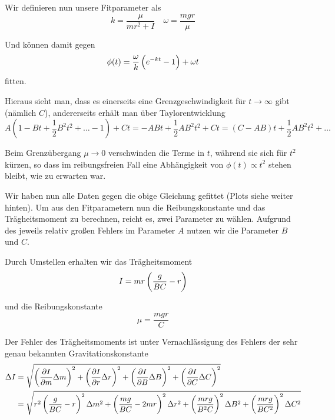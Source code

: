 \documentclass[a4paper,german,12pt,smallheadings]{scrartcl}
\begin{document}
Wir definieren nun unsere Fitparameter als
\begin{equation}
  k = \frac{\mu}{mr^2 + I} \quad
  \omega = \frac{mgr}{\mu}
\end{equation}

Und können damit gegen
\begin{equation}
  \phi(t) = \frac{\omega}{k} \del{e^{-kt} - 1} + \omega t
\end{equation}
fitten.

Hieraus sieht man, dass es einerseits eine Grenzgeschwindigkeit für $t \to
\infty$ gibt (nämlich $C$), andererseits erhält man über Taylorentwicklung
\begin{equation}
  A(1-Bt+\frac{1}{2}B^2t^2 + \dots - 1) + Ct = -ABt+\frac{1}{2}AB^2t^2 + Ct = (C-AB)t+ \frac{1}{2}AB^2 t^2 + \dots
\end{equation}

Beim Grenzübergang $\mu \to 0$ verschwinden die Terme in $t$, während sie sich
für $t^2$ kürzen, so dass im reibungsfreien Fall eine Abhängigkeit von $\phi(t)
\propto t^2$ stehen bleibt, wie zu erwarten war.

Wir haben nun alle Daten gegen die obige Gleichung gefittet (Plots siehe weiter
hinten). Um aus den Fitparametern nun die Reibungskonstante und das
Trägheitsmoment zu berechnen, reicht es, zwei Parameter zu wählen. Aufgrund des
jeweils relativ großen Fehlers im Parameter $A$ nutzen wir die Parameter $B$
und $C$.

Durch Umstellen erhalten wir das Trägheitsmoment
\begin{equation}
  I = mr \del{\frac{g}{BC} - r}
\end{equation}

und die Reibungskonstante
\begin{equation}
  \mu = \frac{mgr}{C}
\end{equation}

Der Fehler des Trägheitsmoments ist unter Vernachlässigung des Fehlers der sehr
genau bekannten Gravitationskonstante %
\begin{align*}
  \Delta I &= \sqrt{
    \del{\frac{\partial I}{\partial m} \Delta m}^2 +
    \del{\frac{\partial I}{\partial r} \Delta r}^2 +
    \del{\frac{\partial I}{\partial B} \Delta B}^2 +
    \del{\frac{\partial I}{\partial C} \Delta C}^2
  } \\
  &= \sqrt{
    r^2\del{\frac{g}{BC} -r}^2 \Delta m^2 +
    \del{\frac{mg}{BC} - 2mr}^2 \Delta r^2 +
    \del{\frac{mrg}{B^2C}}^2 \Delta B^2 +
    \del{\frac{mrg}{BC^2}}^2 \Delta C^2
  }
\end{align*}
\end{document}
